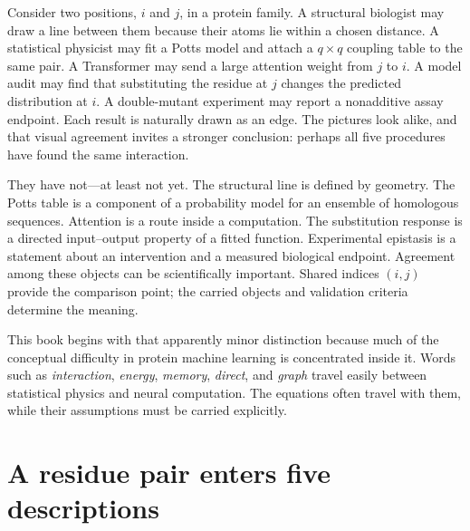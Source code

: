 Consider two positions, $i$ and $j$, in a protein family.  A structural biologist may draw a line
between them because their atoms lie within a chosen distance.  A statistical physicist may fit a
Potts model and attach a $q\times q$ coupling table to the same pair.  A Transformer may send a
large attention weight from $j$ to $i$.  A model audit may find that substituting the residue at
$j$ changes the predicted distribution at $i$.  A double-mutant experiment may report a nonadditive
assay endpoint.  Each result is naturally drawn as an edge.  The pictures look alike, and that visual
agreement invites a stronger conclusion: perhaps all five procedures have found the same
interaction.

They have not---at least not yet.  The structural line is defined by geometry.  The Potts table is
a component of a probability model for an ensemble of homologous sequences.  Attention is a route
inside a computation.  The substitution response is a directed input--output property of a fitted
function.  Experimental epistasis is a statement about an intervention and a measured biological
endpoint.  Agreement among these objects can be scientifically important.  Shared indices $(i,j)$
provide the comparison point; the carried objects and validation criteria determine the meaning.

This book begins with that apparently minor distinction because much of the conceptual difficulty
in protein machine learning is concentrated inside it.  Words such as \emph{interaction},
\emph{energy}, \emph{memory}, \emph{direct}, and \emph{graph} travel easily between statistical
physics and neural computation.  The equations often travel with them, while their assumptions
must be carried explicitly.

\section{A residue pair enters five descriptions}

